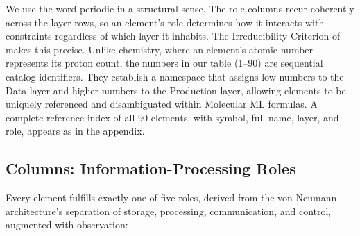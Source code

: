 \documentclass[10pt,twocolumn]{article}
\begin{document}
We use the word periodic in a structural sense. The role columns recur coherently across the layer rows, so an element's role determines how it interacts with constraints regardless of which layer it inhabits. The Irreducibility Criterion of  makes this precise. Unlike chemistry, where an element's atomic number represents its proton count, the numbers in our table (1--90) are sequential catalog identifiers. They establish a namespace that assigns low numbers to the Data layer and higher numbers to the Production layer, allowing elements to be uniquely referenced and disambiguated within Molecular ML formulas. A complete reference index of all 90 elements, with symbol, full name, layer, and role, appears as  in the appendix.

\subsection{Columns: Information-Processing Roles}

Every element fulfills exactly one of five roles, derived from the von Neumann architecture's separation of storage, processing, communication, and control, augmented with observation:
\end{document}
